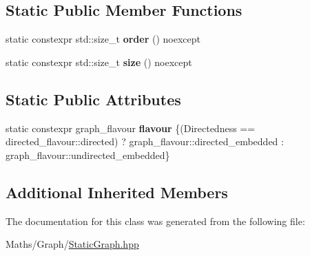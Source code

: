 \subsection*{Static Public Member Functions}
\begin{DoxyCompactItemize}
\item 
\mbox{\label{classsequoia_1_1maths_1_1static__embedded__graph_abe3aaead488e4415671438bf8d4fe19e}} 
static constexpr std\+::size\+\_\+t {\bfseries order} () noexcept
\item 
\mbox{\label{classsequoia_1_1maths_1_1static__embedded__graph_abde4c99cf6b72f82cee295ddbf31699e}} 
static constexpr std\+::size\+\_\+t {\bfseries size} () noexcept
\end{DoxyCompactItemize}
\subsection*{Static Public Attributes}
\begin{DoxyCompactItemize}
\item 
\mbox{\label{classsequoia_1_1maths_1_1static__embedded__graph_a2c976bf390f7d8cb4627147289bdb936}} 
static constexpr graph\+\_\+flavour {\bfseries flavour} \{(Directedness == directed\+\_\+flavour\+::directed) ? graph\+\_\+flavour\+::directed\+\_\+embedded \+: graph\+\_\+flavour\+::undirected\+\_\+embedded\}
\end{DoxyCompactItemize}
\subsection*{Additional Inherited Members}


The documentation for this class was generated from the following file\+:\begin{DoxyCompactItemize}
\item 
Maths/\+Graph/\mbox{\hyperlink{_static_graph_8hpp}{Static\+Graph.\+hpp}}\end{DoxyCompactItemize}
